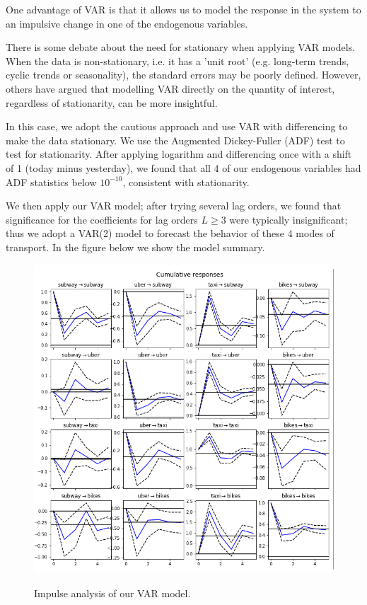 \documentclass[12pt]{article}
\begin{document}
One advantage of VAR is that it allows us to model the response in the system to an impulsive change in one of the endogenous variables. 

There is some debate about the need for stationary when applying VAR models. When the data is non-stationary, i.e. it has a 'unit root' (e.g. long-term trends, cyclic trends or seasonality), the standard errors may be poorly defined. However, others have argued that modelling VAR directly on the quantity of interest, regardless of stationarity, can be more insightful.

In this case, we adopt the cautious approach and use VAR with differencing to make the data stationary. We use the Augmented Dickey-Fuller (ADF) test to test for stationarity. After applying logarithm and differencing once with a shift of 1 (today minus yesterday), we found that all 4 of our endogenous variables had ADF statistics below $10^{-10}$, consistent with stationarity. 

We then apply our VAR model; after trying several lag orders, we found that significance for the coefficients for lag orders $L \ge 3$ were typically insignificant; thus we adopt a VAR(2) model to forecast the behavior of these 4 modes of transport. In the figure below we show the model summary.


\begin{figure}[htbp]
    \includegraphics[scale=1.0]{VAR_correlation.PNG} \label{fig:var_matrix}
    \caption{Impulse analysis of our VAR model.}
\end{figure}
\end{document}
